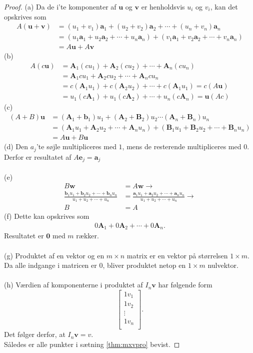 \begin{proof}
(a)
Da de i'te komponenter af $\textbf{u}$ og $\textbf{v}$ er henholdsvis $u_i$ og $v_i$, kan det opskrives som
\begin{align*}
A(\mathbf{u}+\mathbf{v})&=(u_1+v_1)\mathbf{a}_1+(u_2+v_2)\mathbf{a}_2+\cdots + (u_n+v_n)\mathbf{a}_n \\
&=(u_1\mathbf{a}_1+u_2\mathbf{a}_2+\cdots+u_n\mathbf{a}_n)+(v_1\mathbf{a}_1+v_2\mathbf{a}_2+\cdots+v_n\mathbf{a}_n) \\
&=A\mathbf{u}+A\mathbf{v}
\end{align*}
(b)
\begin{align*}
A(c \textbf{u})&=\textbf{A}_1(cu_1)+\textbf{A}_2(cu_2) + \cdots + \textbf{A}_n(cu_n) \\
&=\textbf{A}_1cu_1+\textbf{A}_2cu_2 + \cdots + \textbf{A}_ncu_n \\
&=c(\textbf{A}_1u_1)+c(\textbf{A}_2u_2)+\cdots+c(\textbf{A}_1u_1)
=c(A \textbf{u}) \\
&= u_1(c\textbf{A}_1)+u_1(c\textbf{A}_2)+\cdots+u_n(c\textbf{A}_n)=\textbf{u}(Ac)
\end{align*}
(c)
\begin{align*}
(A+B)\textbf{u}&=(\textbf{A}_1+\textbf{b}_1)u_1 +(\textbf{A}_2+\textbf{B}_2)u_2 \cdots (\textbf{A}_n+\textbf{B}_n)u_n \\
&=(\textbf{A}_1u_1+\textbf{A}_2u_2+ \cdots + \textbf{A}_nu_n)+(\textbf{B}_1u_1+\textbf{B}_2u_2+ \cdots + \textbf{B}_nu_n) \\
&=A\textbf{u}+B\textbf{u}
\end{align*}
(d)
Den $a_j$'te søjle multipliceres med $1$, mens de resterende multipliceres med $0$. 
Derfor er resultatet af $A\mathbf{e}_j=\mathbf{a}_j$ \\\\
(e)
\begin{align*}
B\textbf{w}&=A\textbf{w} \rightarrow\\  \frac{\textbf{b}_1u_1+\textbf{b}_2u_2+\cdots+\textbf{b}_nu_n}{u_1+u_2+\cdots+u_n} &=\frac{\textbf{a}_1u_1+\textbf{a}_2u_2+\cdots+\textbf{a}_nu_n}{u_1+u_2+\cdots+u_n} \rightarrow\\   B&=A 
\end{align*}
(f)
Dette kan opskrives som
\begin{align*}
0\textbf{A}_1+0\textbf{A}_2+\cdots+0\textbf{A}_n.
\end{align*}
Resultatet er $\textbf{0}$ med $m$ rækker. \\\\
(g)
Produktet af en vektor og en $m \times n$ matrix er en vektor på størrelsen $1 \times m$. Da alle indgange i matricen er $0$, bliver produktet netop en $1 \times m$ nulvektor. 
\\\\
(h)
Værdien af komponenterne i produktet af $I_n\mathbf{v}$ har følgende form 
$$
\begin{bmatrix}
1v_1 \\
1v_2 \\
\vdots \\
1v_n  \\
\end{bmatrix}.
$$
Det følger derfor, at $I_n\mathbf{v}=v$.\\
Således er alle punkter i sætning \ref{thm:mxvpro} bevist. 
\end{proof}